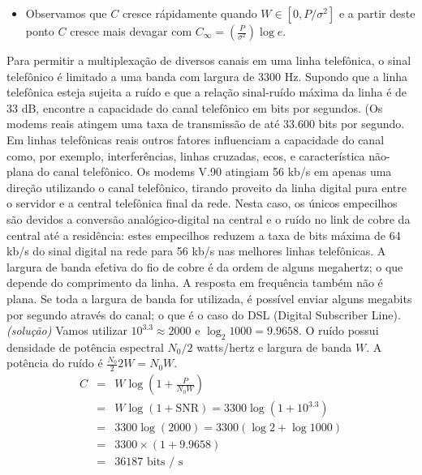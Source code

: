 \begin{frame}[allowframebreaks]
\begin{itemize}
  \item Observamos que $C$ cresce rápidamente quando $W \in [0, P/\sigma^2]$ e a partir deste ponto
	$C$ cresce mais devagar com $C_\infty = \left( \frac{P}{\sigma^2} \right) \log e$.
  \end{itemize}

  \begin{exercise}
  Para permitir a multiplexação de diversos canais em uma linha telefônica,
  o sinal telefônico é limitado a uma banda com largura de 3300 Hz. Supondo que a linha
  telefônica esteja sujeita a ruído e que a relação sinal-ruído máxima da linha
  é de 33 dB, encontre a capacidade do canal telefônico em bits por segundos.
  (Os modems reais atingem uma taxa de transmissão de até 33.600 bits por segundo.
  Em linhas telefônicas reais outros fatores influenciam a capacidade do canal como,
  por exemplo, interferências, linhas cruzadas, ecos, e característica não-plana
  do canal telefônico.
  \exercisebreak 
  Os modems V.90 atingiam 56 kb/s em apenas uma direção utilizando o canal telefônico,
  tirando proveito da linha digital pura entre o servidor e a central telefônica final da rede.
  Nesta caso, os únicos empecilhos são devidos a conversão analógico-digital na central e
  o ruído no link de cobre da central até a residência: estes empecilhos reduzem a taxa de bits
  máxima de 64 kb/s do sinal digital na rede para 56 kb/s nas melhores linhas telefônicas.
  A largura de banda efetiva do fio de cobre é da ordem de alguns megahertz; o que depende
  do comprimento da linha. A resposta em frequência também não é plana. Se toda a largura de banda
  for utilizada, é possível enviar alguns megabits por segundo através do canal; o que é o
  caso do DSL (Digital Subscriber Line).
  \exercisebreak
  \textit{(solução)}
  Vamos utilizar $10^{3.3} \approx 2000$ e $\log_2 1000 = 9.9658$.
  O ruído possui densidade de potência espectral $N_0/2$ watts/hertz e largura de banda $W$.
  A potência do ruído é $\frac{N_0}{2} 2W = N_0 W$.
  \begin{eqnarray}
  C &=& W \log \left( 1 + \frac{P}{N_0 W} \right) \\
  &=& W \log \left( 1 + \text{SNR} \right) = 3300 \log (1 + 10^{3.3}) \\
  &=& 3300 \log \left( 2000 \right) = 3300 (\log 2 + \log 1000) \\
  &=& 3300 \times (1 + 9.9658) \\
  &=& 36187 \text{ bits / s}
  \end{eqnarray}
 
  \end{exercise}
\end{frame}



